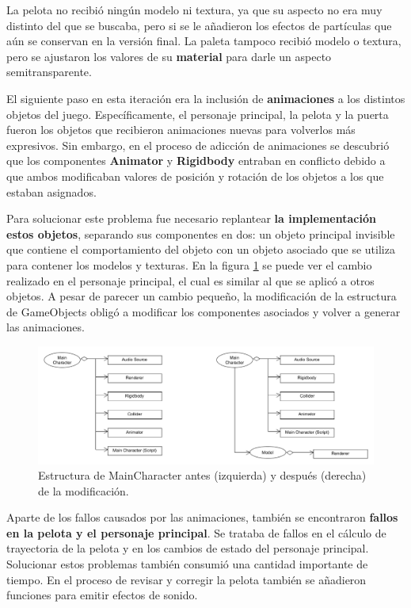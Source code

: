 La pelota no recibió ningún modelo ni textura, ya que su aspecto no era muy distinto del que se buscaba, pero si se le añadieron los efectos de partículas que aún se conservan en la versión final. La paleta tampoco recibió modelo o textura, pero se ajustaron los valores de su \textbf{material} para darle un aspecto semitransparente.

El siguiente paso en esta iteración era la inclusión de \textbf{animaciones} a los distintos objetos del juego. Específicamente, el personaje principal, la pelota y la puerta fueron los objetos que recibieron animaciones nuevas para volverlos más expresivos. Sin embargo, en el proceso de adicción de animaciones se descubrió que los componentes \textbf{Animator} y \textbf{Rigidbody} entraban en conflicto debido a que ambos modificaban valores de posición y rotación de los objetos a los que estaban asignados.

Para solucionar este problema fue necesario replantear \textbf{la implementación estos objetos}, separando sus componentes en dos: un objeto principal invisible que contiene el comportamiento del objeto con un objeto asociado que se utiliza para contener los modelos y texturas. En la figura \ref{old_main_character} se puede ver el cambio realizado en el personaje principal, el cual es similar al que se aplicó a otros objetos. A pesar de parecer un cambio pequeño, la modificación de la estructura de GameObjects obligó a modificar los componentes asociados y volver a generar las animaciones.
\begin{figure}[!t]
    \centering
    \includegraphics[width=1\textwidth]{images/resultados/desarrollo/old_main_character}
    \caption{Estructura de MainCharacter antes (izquierda) y después (derecha) de la modificación.}
    \label{old_main_character}
\end{figure}

Aparte de los fallos causados por las animaciones, también se encontraron \textbf{fallos en la pelota y el personaje principal}. Se trataba de fallos en el cálculo de trayectoria de la pelota y en los cambios de estado del personaje principal. Solucionar estos problemas también consumió una cantidad importante de tiempo. En el proceso de revisar y corregir la pelota también se añadieron funciones para emitir efectos de sonido.


